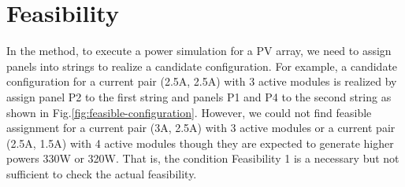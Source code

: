\documentclass[conference]{IEEEtran}
\begin{document}






\section{Feasibility}\label{Sec4}
In the method\cite{orozco2016optimized}, to execute a power simulation for a PV array, we need to assign panels into strings to realize a candidate configuration. For example, a candidate configuration for a current pair (2.5A, 2.5A) with 3 active modules is realized by assign panel P2  to the first string and panels P1 and P4 to the second string as shown in Fig.\ref{fig:feasible-configuration}. However, we could not find feasible assignment for a current pair (3A, 2.5A) with 3 active modules or a current pair (2.5A, 1.5A) with 4 active modules though they are expected to generate higher powers 330W or 320W. That is, the condition Feasibility 1 is a necessary but not sufficient to check the actual feasibility.
\end{document}
